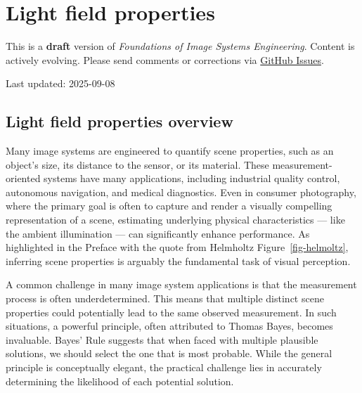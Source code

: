 \documentclass[
  letterpaper,
]{book}
\begin{document}
\chapter{Light field properties}\label{sec-lightfield-properties}

\begin{tcolorbox}[enhanced jigsaw, colframe=quarto-callout-warning-color-frame, titlerule=0mm, rightrule=.15mm, opacitybacktitle=0.6, colback=white, leftrule=.75mm, coltitle=black, title=\textcolor{quarto-callout-warning-color}{\faExclamationTriangle}\hspace{0.5em}{Work in Progress}, bottomrule=.15mm, colbacktitle=quarto-callout-warning-color!10!white, breakable, left=2mm, bottomtitle=1mm, toptitle=1mm, opacityback=0, arc=.35mm, toprule=.15mm]

This is a \textbf{draft} version of \emph{Foundations of Image Systems
Engineering}. Content is actively evolving. Please send comments or
corrections via \href{https://github.com/wandell/FISE-git/issues}{GitHub
Issues}.

Last updated: 2025-09-08

\end{tcolorbox}

\section{Light field properties
overview}\label{sec-lightfield-properties-overview}

Many image systems are engineered to quantify scene properties, such as
an object's size, its distance to the sensor, or its material. These
measurement-oriented systems have many applications, including
industrial quality control, autonomous navigation, and medical
diagnostics. Even in consumer photography, where the primary goal is
often to capture and render a visually compelling representation of a
scene, estimating underlying physical characteristics --- like the
ambient illumination --- can significantly enhance performance. As
highlighted in the Preface with the quote from Helmholtz
Figure~\ref{fig-helmoltz}, inferring scene properties is arguably the
fundamental task of visual perception.

A common challenge in many image system applications is that the
measurement process is often underdetermined. This means that multiple
distinct scene properties could potentially lead to the same observed
measurement. In such situations, a powerful principle, often attributed
to Thomas Bayes, becomes invaluable. Bayes' Rule suggests that when
faced with multiple plausible solutions, we should select the one that
is most probable. While the general principle is conceptually elegant,
the practical challenge lies in accurately determining the likelihood of
each potential solution.
\end{document}
